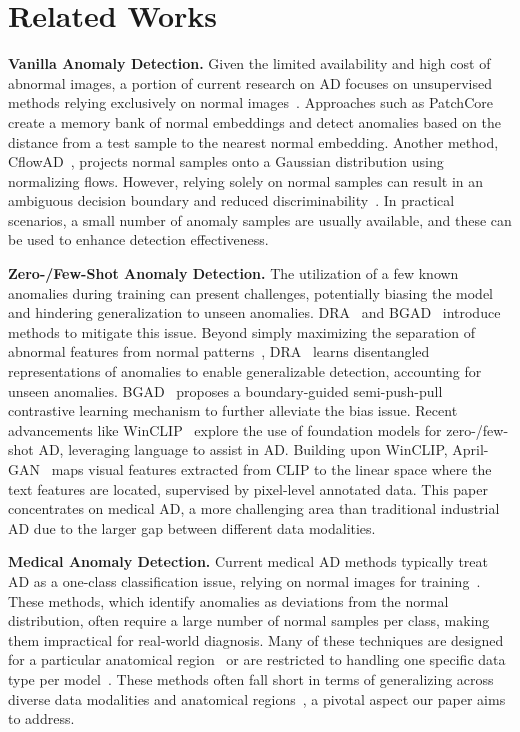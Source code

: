 \section{Related Works}
\label{sec:related}

\noindent\textbf{Vanilla Anomaly Detection.}
Given the limited availability and high cost of abnormal images, a portion of current research on AD focuses on unsupervised methods relying exclusively on normal images~\cite{Sabokrou2018Adversarially,gong2019memorizing,US,metaformer,cutpaste,GP,ARNet,gudovskiy2022cflow,deng2022anomaly,patchcore,MKD}. Approaches such as PatchCore~\cite{patchcore} create a memory bank of normal embeddings and detect anomalies based on the distance from a test sample to the nearest normal embedding. Another method, CflowAD~\cite{gudovskiy2022cflow}, projects normal samples onto a Gaussian distribution using normalizing flows. However, relying solely on normal samples can result in an ambiguous decision boundary and reduced discriminability~\cite{bergmann2019mvtec}. In practical scenarios, a small number of anomaly samples are usually available, and these can be used to enhance detection effectiveness.

\noindent\textbf{Zero-/Few-Shot Anomaly Detection.} The utilization of a few known anomalies during training can present challenges, potentially biasing the model and hindering generalization to unseen anomalies. DRA~\cite{DRA} and BGAD~\cite{BGAD} introduce methods to mitigate this issue. Beyond simply maximizing the separation of abnormal features from normal patterns~\cite{SAD,DEVNET}, DRA~\cite{DRA} learns disentangled representations of anomalies to enable generalizable detection, accounting for unseen anomalies. BGAD~\cite{BGAD} proposes a boundary-guided semi-push-pull contrastive learning mechanism to further alleviate the bias issue. Recent advancements like WinCLIP~\cite{winclip} explore the use of foundation models for zero-/few-shot AD, leveraging language to assist in AD. Building upon WinCLIP, April-GAN~\cite{chen2023zero} maps visual features extracted from CLIP to the linear space where the text features are located, supervised by pixel-level annotated data. This paper concentrates on medical AD, a more challenging area than traditional industrial AD due to the larger gap between different data modalities.

\noindent\textbf{Medical Anomaly Detection.}
Current medical AD methods typically treat AD as a one-class classification issue, relying on normal images for training~\cite{zhou2020encoding,zhang2020viral,zhou2021proxy,zhou2021memorizing,bao2023bmad,cai2023dual,jiang2023multi}. These methods, which identify anomalies as deviations from the normal distribution, often require a large number of normal samples per class, making them impractical for real-world diagnosis. Many of these techniques are designed for a particular anatomical region~\cite{ding2022unsupervised,xu2022afsc} or are restricted to handling one specific data type per model~\cite{wolleb2022diffusion,huang2022lesionpaste,li2021unsupervised}. These methods often fall short in terms of generalizing across diverse data modalities and anatomical regions~\cite{zhang2023grace}, a pivotal aspect our paper aims to address.


